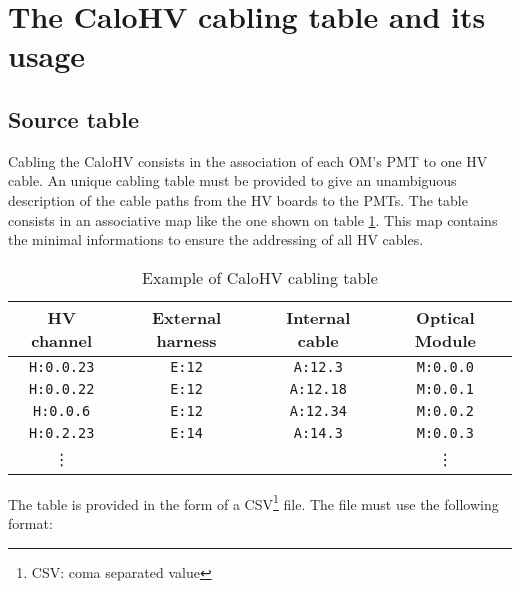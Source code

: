 
\section{The CaloHV cabling table and its usage}

\subsection{Source table}

Cabling the CaloHV consists in the association of each OM's PMT to one
HV  cable.  An  unique  cabling  table must  be  provided  to give  an
unambiguous description of the cable paths  from the HV boards to the
PMTs.  The table consists in an associative map like the one shown
on table \ref{tab:calohv:map:1}. This map contains the minimal
informations to ensure the addressing of all HV cables.

\begin{table}[h]
\begin{center}
\begin{tabular}{|c|c|c|c|}
  \hline
  \textbf{HV channel}& \textbf{External harness} & \textbf{Internal cable} & \textbf{Optical Module} \\
  \hline
  \hline
  \texttt{H:0.0.23}  & \texttt{E:12} & \texttt{A:12.3} & \texttt{M:0.0.0} \\
  \hline
  \texttt{H:0.0.22}  & \texttt{E:12} & \texttt{A:12.18} & \texttt{M:0.0.1} \\
  \hline
  \texttt{H:0.0.6}  & \texttt{E:12} & \texttt{A:12.34} & \texttt{M:0.0.2} \\
  \hline
  \texttt{H:0.2.23}  & \texttt{E:14} & \texttt{A:14.3} & \texttt{M:0.0.3} \\
  \hline
  \vdots          & & & \vdots             \\  
  \hline
\end{tabular}
\end{center}
\caption{Example of CaloHV cabling table}
\label{tab:calohv:map:1}
\end{table}

\par\noindent  The   table is   provided  in  the  form   of  a
CSV\footnote{CSV: coma  separated value} file.  The file must  use the
following format:

